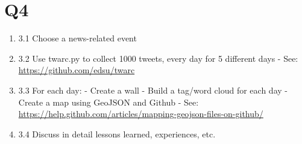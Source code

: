 \section{Q4}
\label{part4}
\begin{enumerate}

\item 3.1 Choose a news-related event

\item 3.2 Use twarc.py to collect 1000 tweets, every day for 5 different days
\subitem - See: \url{https://github.com/edsu/twarc}

\item 3.3 For each day:
\subitem - Create a wall
\subitem - Build a tag/word cloud for each day
\subitem - Create a map using GeoJSON and Github
\subsubitem - See: \url{https://help.github.com/articles/mapping-geojson-files-on-github/}

\item 3.4 Discuss in detail lessons learned, experiences, etc.

\end{enumerate}



